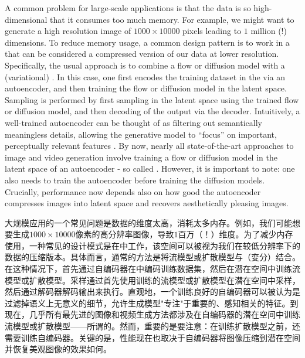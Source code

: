 \begin{remarkbox}
A common problem for large-scale applications is that the data is so high-dimensional that it consumes too much memory. For example, we might want to generate a high resolution image of $1000\times 10000$ pixels leading to $1$ million (!) dimensions. To reduce memory usage, a common design pattern is to work in a  that can be considered a compressed version of our data at lower resolution.  Specifically, the usual approach is to combine a flow or diffusion model with a (variational)  \cite{latent_diffusion}. In this case, one first encodes the training dataset in the  via an autoencoder, and then training the flow or diffusion model in the latent space. Sampling is performed by first sampling in the latent space using the trained flow or diffusion model, and then decoding of the output via the decoder. Intuitively, a well-trained autoencoder can be thought of as filtering out semantically meaningless details, allowing the generative model to ``focus'' on important, perceptually relevant features \cite{latent_diffusion}. By now, nearly all state-of-the-art approaches to image and video generation involve training a flow or diffusion model in the latent space of an autoencoder - so called  \citep{latent_diffusion,vahdat2021score}. However, it is important to note: one also needs to train the autoencoder before training the diffusion models. Crucially, performance now depends also on how good the autoencoder compresses images into latent space and recovers aesthetically pleasing images.
\end{remarkbox}

\begin{remarkbox}[在潜在空间中工作]
大规模应用的一个常见问题是数据的维度太高，消耗太多内存。例如，我们可能想要生成$1000\times 10000$像素的高分辨率图像，导致$1$百万（！）维度。为了减少内存使用，一种常见的设计模式是在中工作，该空间可以被视为我们在较低分辨率下的数据的压缩版本。具体而言，通常的方法是将流模型或扩散模型与（变分）结合\cite{latent_diffusion}。在这种情况下，首先通过自编码器在中编码训练数据集，然后在潜在空间中训练流模型或扩散模型。采样通过首先使用训练的流模型或扩散模型在潜在空间中采样，然后通过解码器解码输出来执行。直观地，一个训练良好的自编码器可以被认为是过滤掉语义上无意义的细节，允许生成模型"专注"于重要的、感知相关的特征\cite{latent_diffusion}。到现在，几乎所有最先进的图像和视频生成方法都涉及在自编码器的潜在空间中训练流模型或扩散模型——所谓的\citep{latent_diffusion,vahdat2021score}。然而，重要的是要注意：在训练扩散模型之前，还需要训练自编码器。关键的是，性能现在也取决于自编码器将图像压缩到潜在空间并恢复美观图像的效果如何。
\end{remarkbox}
